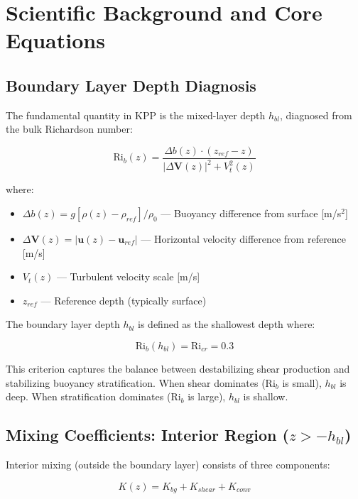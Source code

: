 \documentclass[11pt, a4paper]{article}
\begin{document}
\section{Scientific Background and Core Equations}

\subsection{Boundary Layer Depth Diagnosis}

The fundamental quantity in KPP is the mixed-layer depth $h_{bl}$, diagnosed from the bulk Richardson number:

\begin{equation}
\text{Ri}_b(z) = \frac{\Delta b(z) \cdot (z_{ref} - z)}{|\Delta \mathbf{V}(z)|^2 + V_t^2(z)}
\end{equation}

where:

\begin{itemize}
    \item $\Delta b(z) = g[\rho(z) - \rho_{ref}]/\rho_0$ — Buoyancy difference from surface [m/s$^2$]
    \item $\Delta \mathbf{V}(z) = |\mathbf{u}(z) - \mathbf{u}_{ref}|$ — Horizontal velocity difference from reference [m/s]
    \item $V_t(z)$ — Turbulent velocity scale [m/s]
    \item $z_{ref}$ — Reference depth (typically surface)
\end{itemize}

The boundary layer depth $h_{bl}$ is defined as the shallowest depth where:

\begin{equation}
\text{Ri}_b(h_{bl}) = \text{Ri}_{cr} = 0.3
\end{equation}

This criterion captures the balance between destabilizing shear production and stabilizing buoyancy stratification. When shear dominates ($\text{Ri}_b$ is small), $h_{bl}$ is deep. When stratification dominates ($\text{Ri}_b$ is large), $h_{bl}$ is shallow.

\subsection{Mixing Coefficients: Interior Region ($z > -h_{bl}$)}

Interior mixing (outside the boundary layer) consists of three components:

\begin{equation}
K(z) = K_{bg} + K_{shear} + K_{conv}
\end{equation}
\end{document}
